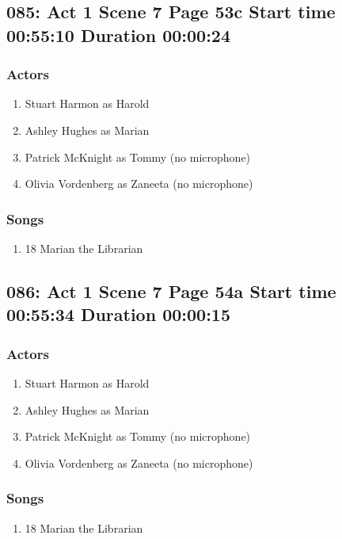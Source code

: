 \subsection{085: Act 1 Scene 7 Page 53c Start time 00:55:10 Duration 00:00:24}

\subsubsection{Actors}
\begin{enumerate}
\item Stuart Harmon as Harold
\item Ashley Hughes as Marian
\item Patrick McKnight as Tommy (no microphone)
\item Olivia Vordenberg as Zaneeta (no microphone)
\end{enumerate}

\subsubsection{Songs}
\begin{enumerate}
\item 18 Marian the Librarian
\end{enumerate}
\subsection{086: Act 1 Scene 7 Page 54a Start time 00:55:34 Duration 00:00:15}

\subsubsection{Actors}
\begin{enumerate}
\item Stuart Harmon as Harold
\item Ashley Hughes as Marian
\item Patrick McKnight as Tommy (no microphone)
\item Olivia Vordenberg as Zaneeta (no microphone)
\end{enumerate}

\subsubsection{Songs}
\begin{enumerate}
\item 18 Marian the Librarian
\end{enumerate}

